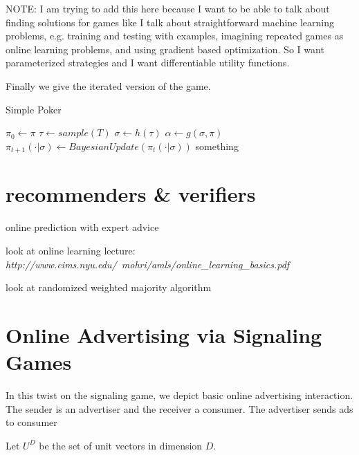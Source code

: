 \documentclass{article}
\begin{document}
NOTE: I am trying to add this here because I want to be able to talk about finding solutions for games like I talk about straightforward machine learning problems, e.g. training and testing with examples, imagining repeated games as online learning problems, and using gradient based optimization. So I want parameterized strategies and I want differentiable utility functions.

Finally we give the iterated version of the game.

\begin{algorithm}
	\caption{Simple Poker}\label{simplepokeralgo}
	\begin{algorithmic}[1]
	\STATE $\pi_0 \leftarrow \pi$
		\STATE $\tau \leftarrow sample(T)$
		\STATE $\sigma \leftarrow h(\tau)$
		\STATE $\alpha \leftarrow g(\sigma, \pi)$
		\STATE $\pi_{t+1}(\cdot|\sigma) \leftarrow BayesianUpdate(\pi_t(\cdot|\sigma))$
		\IF{$\tau = \alpha$} \STATE something \ENDIF
	\ENDFOR
	\end{algorithmic}
\end{algorithm}

\newpage

\section{recommenders \& verifiers}

online prediction with expert advice

look at online learning lecture: \emph{http://www.cims.nyu.edu/~mohri/amls/online\_learning\_basics.pdf}

look at randomized weighted majority algorithm

\section{Online Advertising via Signaling Games}

In this twist on the signaling game, we depict basic online advertising interaction. The sender is an advertiser and the receiver a consumer. The advertiser sends ads to consumer

Let $U^D$ be the set of unit vectors in dimension $D$.
\end{document}
